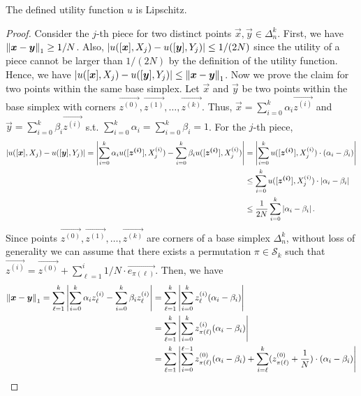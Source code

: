 \begin{claim}\label{clm:majority-lipschitz-holds}
    The defined utility function $u$ 
    is Lipschitz.
\end{claim}
\begin{proof}
    Consider the $j$-th piece for two distinct points $\vec{x}, \vec{y} \in \Delta^k_n$. First, we have $\left \| {\boldsymbol{x} - \boldsymbol{y}} \right\|_{1} \geq 1/N$. Also, $|u([\boldsymbol{x}], X_j) - u([\boldsymbol{y}], Y_j)| \leq 1/(2N)$ since the utility of a piece cannot be larger than $1/(2N)$ by the definition of the utility function. Hence, we have $|u([\boldsymbol{x}], X_j) - u([\boldsymbol{y}], Y_j)| \leq \left \| {\boldsymbol{x} - \boldsymbol{y}} \right\|_{1}$. Now we prove the claim for two points within the same base simplex. Let $\vec{x}$ and $\vec{y}$ be two points within the base simplex with corners $\vec{z^{(0)}}, \vec{z^{(1)}}, \ldots, \vec{z^{(k)}}$. Thus, $\vec{x} = \sum_{i=0}^k \alpha_i \vec{z^{(i)}}$ and $\vec{y} = \sum_{i=0}^k \beta_i \vec{z^{(i)}}$ s.t. $\sum_{i=0}^k \alpha_i = \sum_{i=0}^k \beta_i = 1$. For the $j$-th piece, 
    \begin{align*}
        \left| u([\boldsymbol{x}], X_j) - u([\boldsymbol{y}], Y_j)\right| = \left| \sum_{i=0}^k \alpha_i u([\boldsymbol{z^{(i)}}], X^{(i)}_j) - \sum_{i=0}^k \beta_i u([\boldsymbol{z^{(i)}}], X^{(i)}_j) \right| &=  \left|\sum_{i=0}^k  u([\boldsymbol{z^{(i)}}], X^{(i)}_j) \cdot (\alpha_i - \beta_i)\right|\\
        & \leq \sum_{i=0}^k  u([\boldsymbol{z^{(i)}}], X^{(i)}_j) \cdot \left|\alpha_i - \beta_i \right|\\
        & \leq \frac{1}{2N} \sum_{i=0}^k \left| \alpha_i - \beta_i \right|.
    \end{align*}
    Since points $\vec{z^{(0)}}, \vec{z^{(1)}}, \ldots, \vec{z^{(k)}}$ are corners of a base simplex $\Delta^k_n$, without loss of generality we can assume that there exists a permutation $\pi \in \mathcal{S}_k$ such that $\vec{z^{(i)}} = \vec{z^{(0)}}+\sum_{\ell=1}^i 1/N \cdot \vec{e_{\pi(\ell)}}$. Then, we have 
    \begin{align*}
         \norm{\vec{x} - \vec{y}}{1} = \sum_{\ell=1}^k \left| \sum_{i=0}^k  \alpha_i z^{(i)}_\ell - \sum_{i=0}^k  \beta_i z^{(i)}_\ell\right| &= \sum_{\ell=1}^k \left| \sum_{i=0}^k   z^{(i)}_\ell (\alpha_i - \beta_i)  \right|\\
         & = \sum_{\ell=1}^k \left| \sum_{i=0}^k   z^{(i)}_{\pi(\ell)} (\alpha_i - \beta_i)  \right|\\
         & = \sum_{\ell=1}^k \left| \sum_{i=0}^{\ell - 1}   z^{(0)}_{\pi(\ell)} (\alpha_i - \beta_i) +  \sum_{i=\ell}^{k}   (z^{(0)}_{\pi(\ell)} + \frac{1}{N})\cdot (\alpha_i - \beta_i) \right|\\

\end{align*}
\end{proof}
